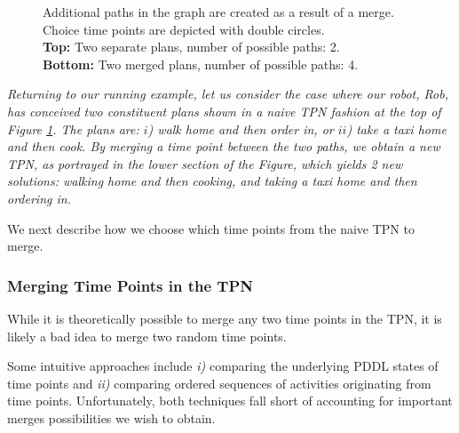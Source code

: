 \begin{figure}
\begin{minipage}[t]{0.5\textwidth}
    \end{minipage}
    \caption{Additional paths in the graph are created as a result of a merge. Choice time points are depicted with double circles.\\
    \textbf{Top:} Two separate plans, number of possible paths: 2. \\
    \textbf{Bottom:} Two merged plans, number of possible paths: 4.}
    \label{fig:add_plans_from_merge}
    \vspace{-4mm}
\end{figure}


\begin{tcolorbox}[colback=red!5!white,colframe=red!75!black]
  \textit{Returning to our running example, let us consider the case where our robot, Rob, has conceived two constituent plans
   shown in a \textit{naive} TPN fashion at the top of Figure \ref{fig:add_plans_from_merge}.
   The plans are: $i$) walk home and then order in, or $ii$) take a taxi home and then cook.
   By merging a time point between the two paths, we obtain a new TPN, as portrayed in the lower section of the Figure, which yields 2 
   new solutions: walking home and then cooking, and taking a taxi home and then ordering in.
  }
\end{tcolorbox}


We next describe how we choose which time points from the naive TPN to merge.


\subsubsection{Merging Time Points in the TPN} 
While it is theoretically possible to merge any two time points in the TPN,
 it is likely a bad idea to merge two random time points. 

Some intuitive approaches include \textit{i)} comparing the underlying PDDL states
of time points and \textit{ii)} comparing ordered sequences of activities originating from time points.
Unfortunately, both techniques fall short of accounting for important merges possibilities we wish to
obtain.

